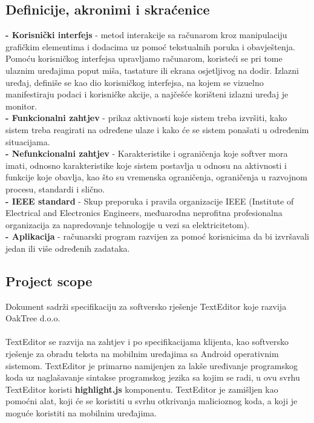 \documentclass[utf8]{article}
\begin{document}
\subsection{Definicije, akronimi i skraćenice}
\textbf{- Korisnički interfejs} - metod interakcije sa računarom kroz manipulaciju grafičkim elementima i dodacima uz pomoć tekstualnih poruka i obavještenja. Pomoću korisničkog interfejsa upravljamo računarom, koristeći se pri tome ulaznim uređajima poput miša, tastature ili ekrana osjetljivog na dodir. Izlazni uređaj, definiše se kao dio korisničkog interfejsa, na kojem se vizuelno manifestiraju podaci i korisničke akcije, a najčešće korišteni izlazni uređaj je monitor.\\
\textbf{- Funkcionalni zahtjev} - prikaz aktivnosti koje sistem treba izvršiti, kako sistem treba reagirati na određene ulaze i kako će se sistem ponašati u određenim situacijama.\\
\textbf{- Nefunkcionalni zahtjev} - Karakteristike i ograničenja koje softver mora imati, odnosno karakteristike koje sistem postavlja u odnosu na aktivnosti i funkcije koje obavlja, kao što su vremenska ograničenja, ograničenja u razvojnom procesu, standardi i slično.\\
\textbf{- IEEE standard} - Skup preporuka i pravila organizacije IEEE (Institute of Electrical and Electronics Engineers, međuarodna neprofitna profesionalna organizacija za napredovanje tehnologije u vezi sa elektricitetom).\\
\textbf{- Aplikacija} - računarski program razvijen za pomoć korisnicima da bi izvršavali jedan ili više određenih zadataka.

\subsection{Project scope}
Dokument sadrži specifikaciju za softversko rješenje TextEditor koje razvija OakTree d.o.o.\\
\\
TextEditor se razvija na zahtjev i po specifikacijama klijenta, kao softversko rješenje za obradu teksta na mobilnim uređajima sa Android operativnim sistemom. TextEditor je primarno namijenjen za lakše uređivanje programskog koda uz naglašavanje sintakse programskog jezika sa kojim se radi, u ovu svrhu TextEditor koristi \textbf{highlight.js} komponentu. TextEditor je zamišljen kao pomoćni alat, koji će se koristiti u svrhu otkrivanja malicioznog koda, a koji je moguće koristiti na mobilnim uređajima.
\end{document}
